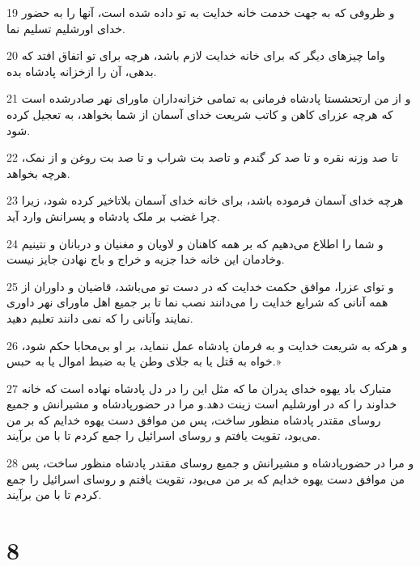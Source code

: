 \par 19 و ظروفی که به جهت خدمت خانه خدایت به تو داده شده است، آنها را به حضور خدای اورشلیم تسلیم نما.
\par 20 واما چیزهای دیگر که برای خانه خدایت لازم باشد، هر‌چه برای تو اتفاق افتد که بدهی، آن را ازخزانه پادشاه بده.
\par 21 و از من ارتحشستا پادشاه فرمانی به تمامی خزانه‌داران ماورای نهر صادرشده است که هر‌چه عزرای کاهن و کاتب شریعت خدای آسمان از شما بخواهد، به تعجیل کرده شود.
\par 22 تا صد وزنه نقره و تا صد کر گندم و تاصد بت شراب و تا صد بت روغن و از نمک، هرچه بخواهد.
\par 23 هر‌چه خدای آسمان فرموده باشد، برای خانه خدای آسمان بلاتاخیر کرده شود، زیرا چرا غضب بر ملک پادشاه و پسرانش وارد آید.
\par 24 و شما را اطلاع می‌دهیم که بر همه کاهنان و لاویان و مغنیان و دربانان و نتینیم وخادمان این خانه خدا جزیه و خراج و باج نهادن جایز نیست.
\par 25 و تو‌ای عزرا، موافق حکمت خدایت که در دست تو می‌باشد، قاضیان و داوران از همه آنانی که شرایع خدایت را می‌دانند نصب نما تا بر جمیع اهل ماورای نهر داوری نمایند وآنانی را که نمی دانند تعلیم دهید.
\par 26 و هر‌که به شریعت خدایت و به فرمان پادشاه عمل ننماید، بر او بی‌محابا حکم شود، خواه به قتل یا به جلای وطن یا به ضبط اموال یا به حبس.»
\par 27 متبارک باد یهوه خدای پدران ما که مثل این را در دل پادشاه نهاده است که خانه خداوند را که در اورشلیم است زینت دهد.و مرا در حضورپادشاه و مشیرانش و جمیع روسای مقتدر پادشاه منظور ساخت، پس من موافق دست یهوه خدایم که بر من می‌بود، تقویت یافتم و روسای اسرائیل را جمع کردم تا با من برآیند.
\par 28 و مرا در حضورپادشاه و مشیرانش و جمیع روسای مقتدر پادشاه منظور ساخت، پس من موافق دست یهوه خدایم که بر من می‌بود، تقویت یافتم و روسای اسرائیل را جمع کردم تا با من برآیند.
 
\chapter{8}

